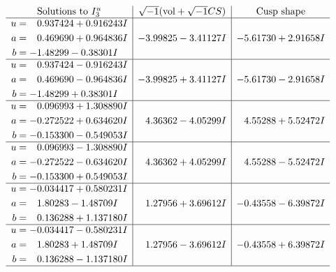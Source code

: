 \documentclass[1p]{elsarticle_modified}
\theoremstyle{definition}
\newcommand{\I}{\sqrt{-1}}
\begin{document}
$$\begin{array}{c|c|c}  
\text{Solutions to }I^u_{3}& \I (\text{vol} + \sqrt{-1}CS) & \text{Cusp shape}\\
 \hline 
\begin{aligned}
u &= \phantom{-}0.937424 + 0.916243 I \\
a &= \phantom{-}0.469690 + 0.964836 I \\
b &= -1.48299 - 0.38301 I\end{aligned}
 & -3.99825 - 3.41127 I & -5.61730 + 2.91658 I \\ \hline\begin{aligned}
u &= \phantom{-}0.937424 - 0.916243 I \\
a &= \phantom{-}0.469690 - 0.964836 I \\
b &= -1.48299 + 0.38301 I\end{aligned}
 & -3.99825 + 3.41127 I & -5.61730 - 2.91658 I \\ \hline\begin{aligned}
u &= \phantom{-}0.096993 + 1.308890 I \\
a &= -0.272522 + 0.634620 I \\
b &= -0.153300 - 0.549053 I\end{aligned}
 & \phantom{-}4.36362 - 4.05299 I & \phantom{-}4.55288 + 5.52472 I \\ \hline\begin{aligned}
u &= \phantom{-}0.096993 - 1.308890 I \\
a &= -0.272522 - 0.634620 I \\
b &= -0.153300 + 0.549053 I\end{aligned}
 & \phantom{-}4.36362 + 4.05299 I & \phantom{-}4.55288 - 5.52472 I \\ \hline\begin{aligned}
u &= -0.034417 + 0.580231 I \\
a &= \phantom{-}1.80283 - 1.48709 I \\
b &= \phantom{-}0.136288 + 1.137180 I\end{aligned}
 & \phantom{-}1.27956 + 3.69612 I & -0.43558 - 6.39872 I \\ \hline\begin{aligned}
u &= -0.034417 - 0.580231 I \\
a &= \phantom{-}1.80283 + 1.48709 I \\
b &= \phantom{-}0.136288 - 1.137180 I\end{aligned}
 & \phantom{-}1.27956 - 3.69612 I & -0.43558 + 6.39872 I\\
 \hline 
 \end{array}$$\newpage\newpage\renewcommand{\arraystretch}{1}
\end{document}
